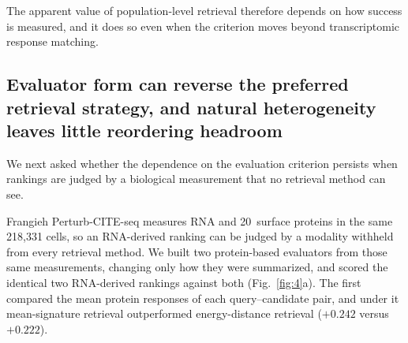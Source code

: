 \documentclass[11pt,letterpaper]{article}
\newcommand{\SHAPEMEANORACLEMEAN}{+0.242}
\newcommand{\SHAPEMEANORACLEENERGY}{+0.222}
\newcommand{\SHAPECELLS}{218{,}331}
\newcommand{\PROTMARKERS}{20}           %
\begin{document}
The apparent value of population-level retrieval therefore depends on how success is measured, and it does so even when the criterion moves beyond transcriptomic response matching.

\subsection*{Evaluator form can reverse the preferred retrieval strategy, and natural heterogeneity leaves little reordering headroom}

We next asked whether the dependence on the evaluation criterion persists when rankings are judged by a biological measurement that no retrieval method can see.

Frangieh Perturb-CITE-seq\cite{dataFrangieh} measures RNA and \PROTMARKERS\ surface proteins in the same \SHAPECELLS{} cells, so an RNA-derived ranking can be judged by a modality withheld from every retrieval method. We built two protein-based evaluators from those same measurements, changing only how they were summarized, and scored the identical two RNA-derived rankings against both (Fig.~\ref{fig:4}a). The first compared the mean protein responses of each query--candidate pair, and under it mean-signature retrieval outperformed energy-distance retrieval ($\SHAPEMEANORACLEMEAN$ versus $\SHAPEMEANORACLEENERGY$).
\end{document}
